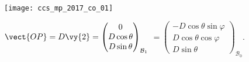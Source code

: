 \ifprof
\begin{corrige} ~\\

\begin{center}
\texttt{[image: ccs\_mp\_2017\_co\_01]}
\end{center}
$\vect{OP}=D\vy{2} = \begin{pmatrix} 0 \\ D \cos \theta \\ D \sin \theta \end{pmatrix}_{\mathcal{B}_{1}}$
$= \begin{pmatrix} - D \cos \theta \sin \varphi \\ D \cos \theta \cos \varphi \\ D \sin \theta \end{pmatrix}_{\mathcal{B}_{0}}$.

\end{corrige}
\else
\fi

